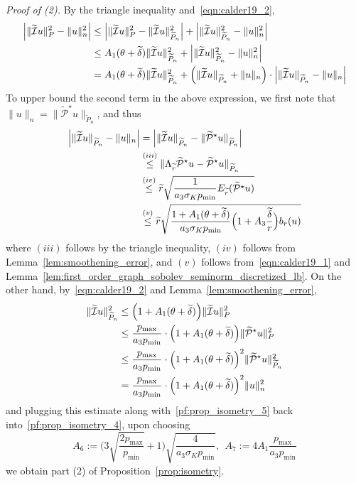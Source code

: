 \documentclass[twoside]{article}
\newcommand{\1}{\mathbf{1}}
\newcommand{\mc}[1]{\mathcal{#1}}
\newcommand{\wt}[1]{\widetilde{#1}}
\theoremstyle{definition}
\theoremstyle{remark}
\begin{document}
\textit{Proof of (2).}
By the triangle inequality and~\eqref{eqn:calder19_2},
\begin{align}
\Bigl|\|\wt{\mc{I}}u\|_{P}^2 - \|u\|_{n}^2\Bigr| & \leq \Bigl|\|\wt{\mc{I}}u\|_{P}^2 - \|\wt{\mc{I}}u\|_{\wt{P}_n}^2\Bigr| + \Bigl|\|\wt{\mc{I}}u\|_{\wt{P}_n}^2 - \|u\|_{n}^2\Bigr| \nonumber \\
& \leq A_1(\theta + \wt{\delta}) \|\wt{\mc{I}}u\|_{\wt{P}_n}^2 + \Bigl|\|\wt{\mc{I}}u\|_{\wt{P}_n}^2 - \|u\|_{n}^2\Bigr| \nonumber\\
& = A_1(\theta + \wt{\delta}) \|\wt{\mc{I}}u\|_{\wt{P}_n}^2 + \Bigl(\|\wt{\mc{I}}u\|_{\wt{P}_n} + \|u\|_{n}\Bigr) \cdot \Bigl|\|\wt{\mc{I}}u\|_{\wt{P}_n} - \|u\|_{n}\Bigr| \label{pf:prop_isometry_4}
\end{align}
To upper bound the second term in the above expression, we first note that~$\|u\|_{n} = \|\wt{\mc{P}}^{\star}u\|_{\wt{P}_n}$, and thus
\begin{align}
\Bigl|\|\wt{\mc{I}}u\|_{\wt{P}_n} - \|u\|_{n} \Bigr| & = \Bigl|\|\wt{\mc{I}}u\|_{\wt{P}_n} - \|\wt{\mc{P}}^{\star}u\|_{\wt{P}_n}\Bigr| \nonumber \\
& \overset{(iii)}{\leq} \|\Lambda_{\wt{r}}\wt{\mc{P}}^{\star}u - \wt{\mc{P}}^{\star}u\|_{\wt{P}_n} \nonumber \\
& \overset{(iv)}{\leq} \wt{r} \sqrt{\frac{1}{a_3\sigma_K p_{\min}} E_{\wt{r}}(\wt{\mc{P}}^{\star}u)} \nonumber \\
& \overset{(v)}{\leq} \wt{r} \sqrt{\frac{1 + A_1(\theta + \wt{\delta})}{a_3\sigma_K p_{\min}} \Bigl(1 + A_3\frac{\wt{\delta}}{r}\Bigr) b_r(u)} \label{pf:prop_isometry_5}
\end{align}
where $(iii)$ follows by the triangle inequality, $(iv)$ follows from Lemma~\ref{lem:smoothening_error}, and $(v)$ follows from~\eqref{eqn:calder19_1} and Lemma~\ref{lem:first_order_graph_sobolev_seminorm_discretized_lb}. On the other hand, by~\eqref{eqn:calder19_2} and Lemma~\ref{lem:smoothening_error},
\begin{align*}
\|\wt{\mc{I}}u\|_{\wt{P}_n}^2 & \leq \Bigl(1 + A_1(\theta + \wt{\delta})\Bigr) \|\wt{\mc{I}}u\|_{P}^2 \\
& \leq \frac{p_{\max}}{a_3p_{\min}} \cdot \Bigl(1 + A_1(\theta + \wt{\delta})\Bigr) \|\wt{\mc{P}}^{\star}u\|_{P}^2 \\
& \leq \frac{p_{\max}}{a_3p_{\min}} \cdot \Bigl(1 + A_1(\theta + \wt{\delta})\Bigr)^2 \|\wt{\mc{P}}^{\star}u\|_{\wt{P}_n}^2 \\
& = \frac{p_{\max}}{a_3p_{\min}} \cdot \Bigl(1 + A_1(\theta + \wt{\delta})\Bigr)^2 \|u\|_{n}^2
\end{align*}
and plugging this estimate along with~\eqref{pf:prop_isometry_5} back into~\eqref{pf:prop_isometry_4}, upon choosing
\begin{equation*}
A_6 := \biggl(3\sqrt{\frac{2p_{\max}}{p_{\min}}} + 1\biggr)\sqrt{\frac{4}{a_3\sigma_Kp_{\min}}},~~A_7:=4A_1\frac{p_{\max}}{a_3p_{\min}}
\end{equation*}
we obtain part (2) of Proposition~\ref{prop:isometry}.
\end{document}
